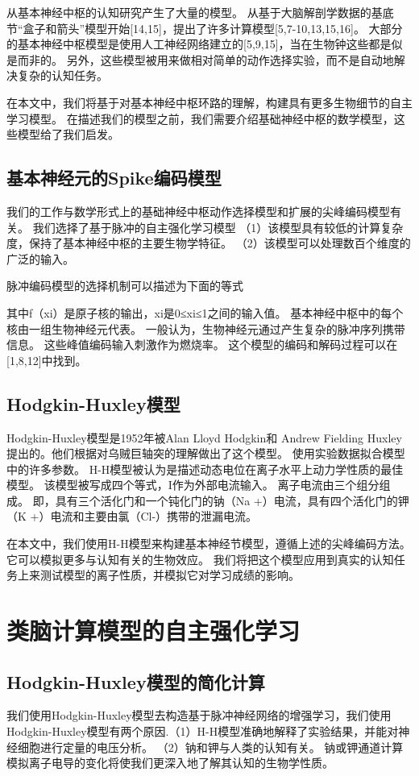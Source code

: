 \documentclass[a4paper,12pt]{ctexart}
\begin{document}
从基本神经中枢的认知研究产生了大量的模型。 从基于大脑解剖学数据的基底节“盒子和箭头”模型开始[14,15]，提出了许多计算模型[5,7-10,13,15,16]。 大部分的基本神经中枢模型是使用人工神经网络建立的[5,9,15]，当在生物钟这些都是似是而非的。 另外，这些模型被用来做相对简单的动作选择实验，而不是自动地解决复杂的认知任务。

在本文中，我们将基于对基本神经中枢环路的理解，构建具有更多生物细节的自主学习模型。 在描述我们的模型之前，我们需要介绍基础神经中枢的数学模型，这些模型给了我们启发。


\subsection{基本神经元的Spike编码模型}

我们的工作与数学形式上的基础神经中枢动作选择模型和扩展的尖峰编码模型有关。
我们选择了基于脉冲的自主强化学习模型
（1）该模型具有较低的计算复杂度，保持了基本神经中枢的主要生物学特征。
（2）该模型可以处理数百个维度的广泛的输入。

脉冲编码模型的选择机制可以描述为下面的等式


其中f（xi）是原子核的输出，xi是0≤xi≤1之间的输入值。
基本神经中枢中的每个核由一组生物神经元代表。 一般认为，生物神经元通过产生复杂的脉冲序列携带信息。 这些峰值编码输入刺激作为燃烧率。 这个模型的编码和解码过程可以在[1,8,12]中找到。

\subsection{Hodgkin-Huxley模型}
Hodgkin-Huxley模型是1952年被Alan Lloyd Hodgkin和 Andrew Fielding Huxley提出的。他们根据对乌贼巨轴突的理解做出了这个模型。 使用实验数据拟合模型中的许多参数。 H-H模型被认为是描述动态电位在离子水平上动力学性质的最佳模型。 该模型被写成四个等式，I作为外部电流输入。
离子电流由三个组分组成。 即，具有三个活化门和一个钝化门的钠（Na +）电流，具有四个活化门的钾（K +）电流和主要由氯（Cl-）携带的泄漏电流。

在本文中，我们使用H-H模型来构建基本神经节模型，遵循上述的尖峰编码方法。 它可以模拟更多与认知有关的生物效应。 我们将把这个模型应用到真实的认知任务上来测试模型的离子性质，并模拟它对学习成绩的影响。

\section{类脑计算模型的自主强化学习}

\subsection{Hodgkin-Huxley模型的简化计算}
我们使用Hodgkin-Huxley模型去构造基于脉冲神经网络的增强学习，我们使用Hodgkin-Huxley模型有两个原因.（1）H-H模型准确地解释了实验结果，并能对神经细胞进行定量的电压分析。 （2）钠和钾与人类的认知有关。 钠或钾通道计算模拟离子电导的变化将使我们更深入地了解其认知的生物学性质。
\end{document}
